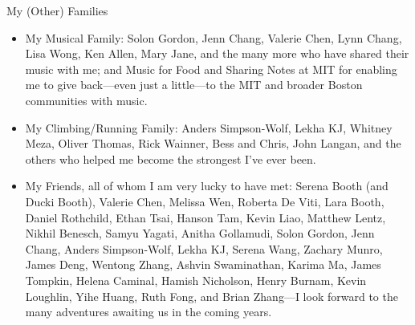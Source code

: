 \begin{center}{My (Other) Families}\end{center} 
    \begin{itemize}
    \item My Musical Family: Solon Gordon, Jenn Chang, Valerie Chen, Lynn Chang, Lisa Wong,
        Ken Allen, Mary Jane, and the many more who have shared their music with
            me; and Music for Food and Sharing Notes at MIT for enabling me to
            give back---even just a little---to the MIT and broader Boston
            communities with music.    

    \item My Climbing/Running Family: Anders Simpson-Wolf, Lekha KJ, Whitney Meza, Oliver Thomas, Rick
        Wainner, Bess and Chris, John Langan, and the others who helped
        me become the strongest I've ever been.

    \item My Friends, all of whom I am very lucky to have met: Serena Booth (and
        Ducki Booth), Valerie Chen, Melissa Wen, Roberta De Viti, Lara Booth,
            Daniel Rothchild, Ethan Tsai, Hanson Tam, Kevin Liao, Matthew Lentz,
            Nikhil Benesch, Samyu Yagati, Anitha Gollamudi, Solon Gordon, Jenn
            Chang, Anders Simpson-Wolf,
            Lekha KJ, Serena Wang, Zachary Munro, James Deng, Wentong Zhang,
            Ashvin Swaminathan, Karima Ma, James Tompkin, Helena Caminal, Hamish
            Nicholson, Henry Burnam, Kevin Loughlin, Yihe Huang, Ruth Fong, and
            Brian Zhang---I look forward to the many adventures awaiting us in
            the coming years.
    \end{itemize}

 
